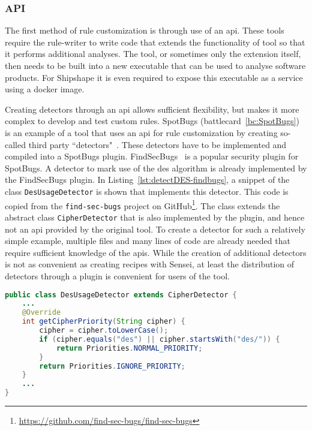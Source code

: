 \subsubsection{API}
The first method of rule customization is through use of an \gls{api}.
These tools require the rule-writer to write code that extends the functionality of tool so that it performs additional analyses.
The tool, or sometimes only the extension itself, then needs to be built into a new executable that can be used to analyse software products.
For Shipshape it is even required to expose this executable as a service using a docker image.

Creating detectors through an \gls{api} allows sufficient flexibility, but makes it more complex to develop and test custom rules.
SpotBugs (battlecard~\ref{bc:SpotBugs}) is an example of a tool that uses an \gls{api} for rule customization by creating so-called third party ``detectors"~\cite{spotbugsapi}.
These detectors have to be implemented and compiled into a SpotBugs plugin.
FindSecBugs~\cite{findsecbugs} is a popular security plugin for SpotBugs.
A detector to mark use of the \gls{des} algorithm is already implemented by the FindSecBugs plugin.
In Listing~\ref{lst:detectDES-findbugs}, a snippet of the class \texttt{DesUsageDetector} is shown that implements this detector.
This code is copied from the \texttt{find-sec-bugs} project on GitHub\footnote{\url{https://github.com/find-sec-bugs/find-sec-bugs}}.
The class extends the abstract class \texttt{CipherDetector} that is also implemented by the plugin, and hence not an \gls{api} provided by the original tool.
To create a detector for such a relatively simple example, multiple files and many lines of code are already needed that require sufficient knowledge of the \glspl{api}.
While the creation of additional detectors is not as convenient as creating recipes with Sensei, at least the distribution of detectors through a plugin is convenient for users of the tool.

\begin{lstlisting}[language={Java},caption={Rule customization of SpotBugs is done through java code using their API.},label={lst:detectDES-findbugs},abovecaptionskip=-0.0pt,xleftmargin=15pt]
public class DesUsageDetector extends CipherDetector {
    ...
    @Override
    int getCipherPriority(String cipher) {
        cipher = cipher.toLowerCase();
        if (cipher.equals("des") || cipher.startsWith("des/")) {
            return Priorities.NORMAL_PRIORITY;
        }
        return Priorities.IGNORE_PRIORITY;
    }
    ...
}
\end{lstlisting}

